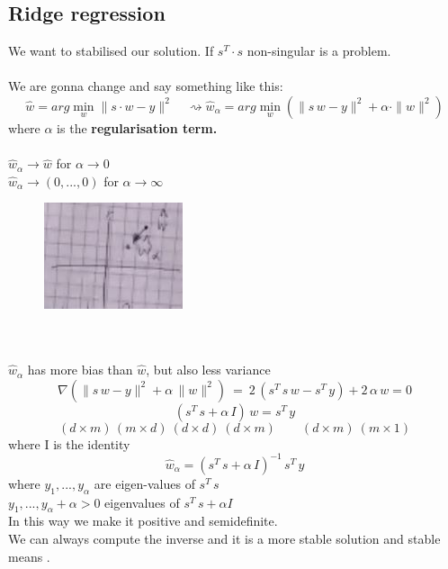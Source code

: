 \documentclass[../main.tex]{subfiles}
\begin{document}
\subsection{Ridge regression}
We want to stabilised our solution. If $s^T \cdot s$ non-singular is a problem.
\\\\
We are gonna change and say something like this:
$$
\hat{w} = arg \min_w \| s \cdot w - y \|^2 \quad \rightsquigarrow \hat{w}_\alpha = arg \min_w \left(\| s \, w - y \|^2 + \alpha \cdot \| w \|^2 \right)
$$
where $\alpha$ is the \textbf{regularisation term.}
\\\\
$
\hat{w}_\alpha \rightarrow \hat{w} 
$ for $\alpha \rightarrow 0$
\\
$
\hat{w}_\alpha \rightarrow (0,..., 0) 
$ for $\alpha \rightarrow \infty$\\
\begin{figure}[h]
    \centering
    \includegraphics[width=0.3\linewidth]{../img/lez14-img1.JPG}
    \caption{}
\end{figure}\\
\\
$\hat{w}_\alpha$ has more bias than $\hat{w}$, but also less variance
\\
$$\nabla \left( \| s \, w - y \|^2 + \alpha \, \| w \|^2 \right) \ = \ 2 \, \left( s^T \, s \, w - s^T \, y \right) + 2 \, \alpha \, w = 0$$
$$
\left(s^T \, s + \alpha \, I \right) \, w = s^T \, y
$$
$$
(d \times m) \, (m \times d) \ (d \times d) \ (d \times m) \qquad (d \times m) \ (m \times 1)
$$
where I is the identity
\\
$$
\hat{w}_\alpha = \left( s^T \, s + \alpha \, I \right)^{-1} \, s^T \, y
$$
where $y_1,..., y_\alpha$ are eigen-values of $s^T \, s$
\\
$ y_1,..., y_\alpha + \alpha > 0 $ eigenvalues of $s^T \, s+ \alpha I$
\\In this way we make it positive and semidefinite.\\
We can always compute the inverse and it is a more stable solution and stable means .
\end{document}

